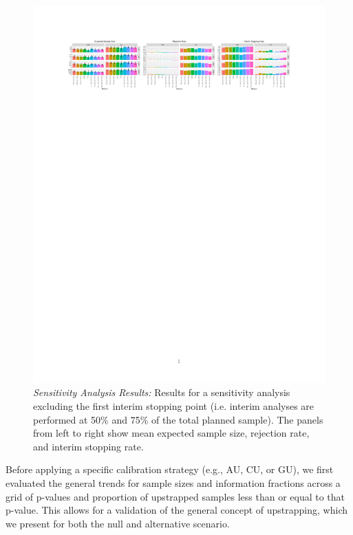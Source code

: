 \documentclass[Afour,sageh,times,square,numbers]{sagej}
\begin{document}
\begin{figure}[t]
  \begin{minipage}[t]{1\linewidth}
    \includegraphics[width=\linewidth]{06_ManuscriptOutput_Figure3.pdf}
    \caption{\textit{Sensitivity Analysis Results:}  Results for a sensitivity analysis excluding the first interim stopping point (i.e. interim analyses are performed at 50\% and 75\% of the total planned sample).  The panels from left to right show mean expected sample size, rejection rate, and interim stopping rate.}
    \label{fig:third}
  \end{minipage}\hfill%
\end{figure}


Before applying a specific calibration strategy (e.g., AU, CU, or GU), we first evaluated the general trends for sample sizes and information fractions across a grid of p-values and proportion of upstrapped samples less than or equal to that p-value. This allows for a validation of the general concept of upstrapping, which we present for both the null and alternative scenario.
\end{document}
